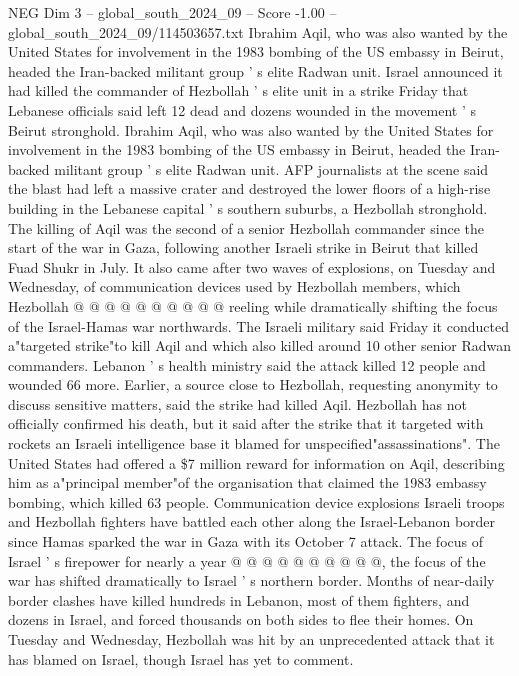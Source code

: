 \begin{textsample}{NEG Dim 3 – global\_south\_2024\_09 – Score -1.00 – global\_south\_2024\_09/114503657.txt}  \label{ex:f3_neg_126}
Ibrahim Aqil, who was also wanted by the United States for involvement in the 1983 bombing of the US embassy in Beirut, headed the Iran-backed militant group ' s elite Radwan unit.
Israel announced it had killed the commander of Hezbollah ' s elite unit in a strike Friday that Lebanese officials said left 12 dead and dozens wounded in the movement ' s Beirut stronghold.
Ibrahim Aqil, who was also wanted by the United States for involvement in the 1983 bombing of the US embassy in Beirut, headed the Iran-backed militant group ' s elite Radwan unit.
AFP journalists at the scene said the blast had left a massive crater and destroyed the lower floors of a high-rise building in the Lebanese capital ' s southern suburbs, a Hezbollah stronghold.
The killing of Aqil was the second of a senior Hezbollah commander since the start of the war in Gaza, following another Israeli strike in Beirut that killed Fuad Shukr in July.
It also came after two waves of explosions, on Tuesday and Wednesday, of communication devices used by Hezbollah members, which Hezbollah @ @ @ @ @ @ @ @ @ @ reeling while dramatically shifting the focus of the Israel-Hamas war northwards.
The Israeli military said Friday it conducted a"targeted strike"to kill Aqil and which also killed around 10 other senior Radwan commanders.
Lebanon ' s health ministry said the attack killed 12 people and wounded 66 more.
Earlier, a source close to Hezbollah, requesting anonymity to discuss sensitive matters, said the strike had killed Aqil.
Hezbollah has not officially confirmed his death, but it said after the strike that it targeted with rockets an Israeli intelligence base it blamed for unspecified"assassinations".
The United States had offered a \$7 million reward for information on Aqil, describing him as a"principal member"of the organisation that claimed the 1983 embassy bombing, which killed 63 people.
Communication device explosions Israeli troops and Hezbollah fighters have battled each other along the Israel-Lebanon border since Hamas sparked the war in Gaza with its October 7 attack.
The focus of Israel ' s firepower for nearly a year @ @ @ @ @ @ @ @ @ @, the focus of the war has shifted dramatically to Israel ' s northern border.
Months of near-daily border clashes have killed hundreds in Lebanon, most of them fighters, and dozens in Israel, and forced thousands on both sides to flee their homes.
On Tuesday and Wednesday, Hezbollah was hit by an unprecedented attack that it has blamed on Israel, though Israel has yet to comment.

\end{textsample}
